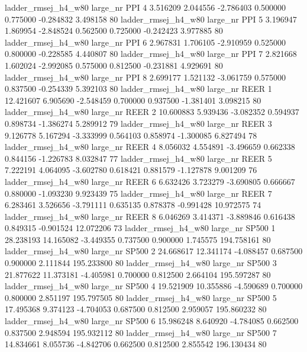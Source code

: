 ladder_rmsej_h4_w80   large_nr      PPI                 4  3.516209  2.044556  -2.786403 0.500000 0.775000 -0.284832    3.498158 80
ladder_rmsej_h4_w80   large_nr      PPI                 5  3.196947  1.869954  -2.848524 0.562500 0.725000 -0.242423    3.977885 80
ladder_rmsej_h4_w80   large_nr      PPI                 6  2.967831  1.706105  -2.910959 0.525000 0.800000 -0.228585    4.440807 80
ladder_rmsej_h4_w80   large_nr      PPI                 7  2.821668  1.602024  -2.992085 0.575000 0.812500 -0.231881    4.929691 80
ladder_rmsej_h4_w80   large_nr      PPI                 8  2.699177  1.521132  -3.061759 0.575000 0.837500 -0.254339    5.392103 80
ladder_rmsej_h4_w80   large_nr     REER                 1 12.421607  6.905690  -2.548459 0.700000 0.937500 -1.381401    3.098215 80
ladder_rmsej_h4_w80   large_nr     REER                 2 10.600883  5.939436  -3.082352 0.594937 0.898734 -1.386274    5.289912 79
ladder_rmsej_h4_w80   large_nr     REER                 3  9.126778  5.167294  -3.333999 0.564103 0.858974 -1.300085    6.827494 78
ladder_rmsej_h4_w80   large_nr     REER                 4  8.056032  4.554891  -3.496659 0.662338 0.844156 -1.226783    8.032847 77
ladder_rmsej_h4_w80   large_nr     REER                 5  7.222191  4.064095  -3.602780 0.618421 0.881579 -1.127878    9.001209 76
ladder_rmsej_h4_w80   large_nr     REER                 6  6.632426  3.723279  -3.690805 0.666667 0.880000 -1.093230    9.923439 75
ladder_rmsej_h4_w80   large_nr     REER                 7  6.283461  3.526656  -3.791111 0.635135 0.878378 -0.991428   10.972575 74
ladder_rmsej_h4_w80   large_nr     REER                 8  6.046269  3.414371  -3.889846 0.616438 0.849315 -0.901524   12.072206 73
ladder_rmsej_h4_w80   large_nr    SP500                 1 28.238193 14.165082  -3.449355 0.737500 0.900000  1.745575  194.758161 80
ladder_rmsej_h4_w80   large_nr    SP500                 2 24.668617 12.341174  -4.088457 0.687500 0.900000  2.111844  195.233800 80
ladder_rmsej_h4_w80   large_nr    SP500                 3 21.877622 11.373181  -4.405981 0.700000 0.812500  2.664104  195.597287 80
ladder_rmsej_h4_w80   large_nr    SP500                 4 19.521909 10.355886  -4.590689 0.700000 0.800000  2.851197  195.797505 80
ladder_rmsej_h4_w80   large_nr    SP500                 5 17.495368  9.374123  -4.704053 0.687500 0.812500  2.959057  195.860232 80
ladder_rmsej_h4_w80   large_nr    SP500                 6 15.986248  8.640920  -4.784085 0.662500 0.837500  2.948594  195.932112 80
ladder_rmsej_h4_w80   large_nr    SP500                 7 14.834661  8.055736  -4.842706 0.662500 0.812500  2.855542  196.130434 80
